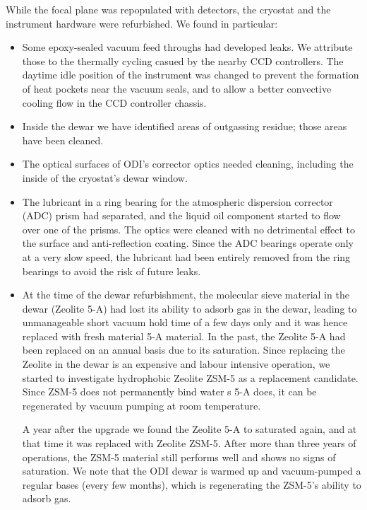 \documentclass[]{spieman}
\begin{document}
While the focal plane was repopulated with detectors, the cryostat and the 
instrument hardware were refurbished. We found in particular:
\begin{itemize}
	\item Some epoxy-sealed vacuum feed throughs had developed  leaks. We 
	attribute those to the thermally cycling casued by the nearby CCD controllers. 
	The daytime idle position of the instrument was changed to prevent the 
	formation of heat pockets near the vacuum seals, and to allow a better
	convective cooling flow in the CCD controller chassis.
	
	\item Inside the dewar we have identified areas of outgassing residue; 
	those areas have been cleaned. 
	
	\item The optical surfaces of ODI's corrector optics needed cleaning,
	 including the inside of the cryostat's dewar window. 
	
	\item The lubricant in a ring bearing for the atmospheric dispersion 
	corrector (ADC) prism had separated, and the liquid oil component started to 
	flow over one of the prisms. The optics were cleaned with no detrimental effect 
	to the surface and anti-reflection coating. Since the ADC bearings operate 
	only at a very slow speed, the lubricant had been entirely removed from the 
	ring bearings to avoid the risk of future leaks. 
	

\item  At the time of the dewar refurbishment, the molecular sieve material in
the dewar (Zeolite 5-A) had lost its ability to adsorb gas in the dewar, leading
to unmanageable short vacuum hold time of a few days only and it was hence 
replaced with fresh material 5-A material. In the past, the Zeolite 5-A had been
replaced on an annual basis due to its saturation. Since replacing the Zeolite
in the dewar is an expensive and labour intensive operation, we started to
investigate hydrophobic Zeolite ZSM-5 as a replacement candidate. Since ZSM-5
does not permanently bind water s 5-A does, it can be regenerated by vacuum
pumping at room temperature.

A year after the upgrade we found the Zeolite 5-A to  saturated again, and at
that time it was replaced with Zeolite ZSM-5. After more than three years of
operations, the ZSM-5 material still performs well and shows no signs of
saturation. We note that the ODI dewar is warmed up and vacuum-pumped a regular
bases (every few months), which is regenerating the ZSM-5's ability to adsorb
gas.
\end{itemize}
\end{document}
